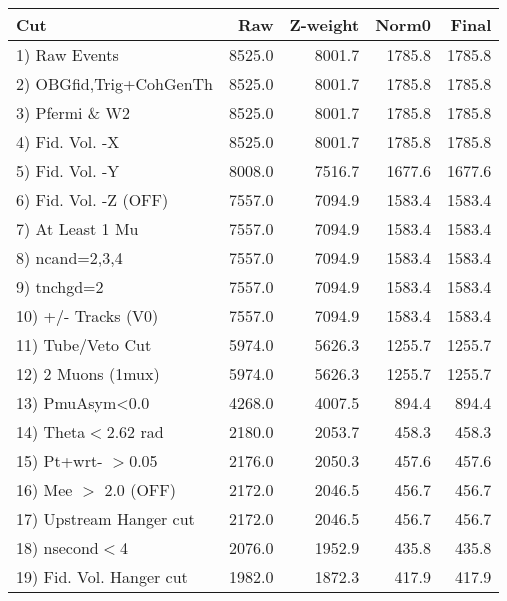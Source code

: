  \begin{table}[h!]\centering
 \begin{tabular}{||l||r|r|r|r||}
 \hline
 \hline
 Cut & Raw & Z-weight & Norm0 & Final \\
 \hline
  1) Raw Events           &      8525.0 &      8001.7 &      1785.8 &      1785.8 \\
  2) OBGfid,Trig+CohGenTh &      8525.0 &      8001.7 &      1785.8 &      1785.8 \\
  3) Pfermi \& W2         &      8525.0 &      8001.7 &      1785.8 &      1785.8 \\
  4) Fid. Vol. -X         &      8525.0 &      8001.7 &      1785.8 &      1785.8 \\
  5) Fid. Vol. -Y         &      8008.0 &      7516.7 &      1677.6 &      1677.6 \\
  6) Fid. Vol. -Z (OFF)   &      7557.0 &      7094.9 &      1583.4 &      1583.4 \\
  7) At Least 1 Mu        &      7557.0 &      7094.9 &      1583.4 &      1583.4 \\
  8) ncand=2,3,4          &      7557.0 &      7094.9 &      1583.4 &      1583.4 \\
  9) tnchgd=2             &      7557.0 &      7094.9 &      1583.4 &      1583.4 \\
 10) +/- Tracks (V0)      &      7557.0 &      7094.9 &      1583.4 &      1583.4 \\
 11) Tube/Veto Cut        &      5974.0 &      5626.3 &      1255.7 &      1255.7 \\
 12) 2 Muons (1mux)       &      5974.0 &      5626.3 &      1255.7 &      1255.7 \\
 13) PmuAsym<0.0          &      4268.0 &      4007.5 &       894.4 &       894.4 \\
 14) Theta$<$2.62 rad     &      2180.0 &      2053.7 &       458.3 &       458.3 \\
 15) Pt+wrt- $>$0.05      &      2176.0 &      2050.3 &       457.6 &       457.6 \\
 16) Mee $>$ 2.0  (OFF)   &      2172.0 &      2046.5 &       456.7 &       456.7 \\
 17) Upstream Hanger cut  &      2172.0 &      2046.5 &       456.7 &       456.7 \\
 18) nsecond$<$4          &      2076.0 &      1952.9 &       435.8 &       435.8 \\
 19) Fid. Vol. Hanger cut &      1982.0 &      1872.3 &       417.9 &       417.9 \\

\end{tabular}
\end{table}

